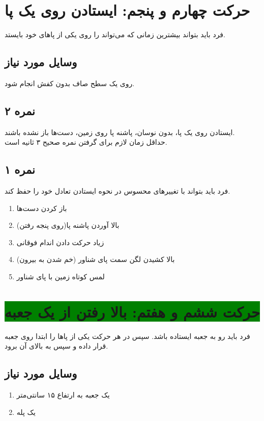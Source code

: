 \documentclass[12pt]{report}
\begin{document}
	\section*{حرکت چهارم و پنجم: ایستادن روی یک پا}
	فرد باید بتواند بیشترین زمانی که می‌تواند را روی یکی از پاهای خود بایستد.
	\subsection*{وسایل مورد نیاز}
	روی یک سطح صاف بدون کفش انجام شود.
	\subsection*{نمره ۲}
	ایستادن روی یک پا، بدون نوسان، پاشنه‌ پا روی زمین، دست‌ها باز نشده باشند. \\
	حداقل زمان لازم برای گرفتن نمره صحیح ۳ ثانیه است.
	\subsection*{نمره ۱}
	فرد باید بتواند با تغییر‌های محسوس در نحوه ایستادن تعادل خود را حفظ کند.
	\begin{enumerate}
		\item باز کردن دست‌ها
		\item بالا آوردن پاشنه پا(روی پنجه رفتن)
		\item زیاد حرکت دادن اندام فوقانی
		\item بالا کشیدن لگن سمت پای شناور (خم شدن به بیرون)
		\item لمس کوتاه زمین با پای شناور
	\end{enumerate}
	\newpage
	
	\section*{\colorbox{green}{حرکت ششم و هفتم: بالا رفتن از یک جعبه}}
	فرد باید رو به جعبه ایستاده باشد. سپس در هر حرکت یکی از پاها را ابتدا روی جعبه قرار داده و سپس به بالای آن برود. 
	\subsection*{وسایل مورد نیاز}
	\begin{enumerate}
		\item یک جعبه به ارتفاع ۱۵ سانتی‌متر
		\item یک پله
	\end{enumerate}
\end{document}

